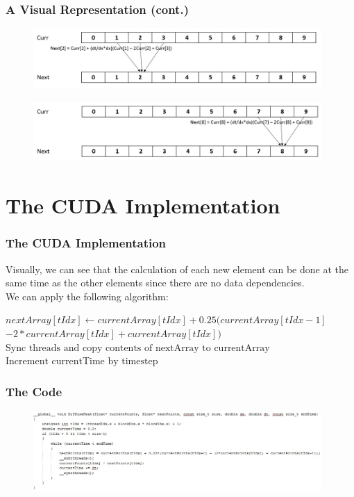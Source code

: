 \documentclass{beamer}
\begin{document}
\begin{frame}
	\frametitle{A Visual Representation (cont.)}
	\begin{figure}
		\includegraphics[width=11cm]{Visual2.jpg}
	\end{figure}
	\bigskip
	\begin{figure}
		\includegraphics[width=11cm]{Visual3.jpg}
	\end{figure}
\end{frame}

\section{The CUDA Implementation}
\begin{frame}
	\frametitle{The CUDA Implementation}
	Visually, we can see that the calculation of each new element can be done at the same time as the other elements since there are no data dependencies.\\
	We can apply the following algorithm:\\
	\begin{algorithmic}
		\State $nextArray[tIdx] \gets currentArray[tIdx] + 0.25(currentArray[tIdx-1]$\\$-2*currentArray[tIdx] + currentArray[tIdx])$
		\State $\text{Sync threads and copy contents of nextArray to currentArray}$
		\State $\text{Increment currentTime by timestep}$		
		\EndWhile
		\EndIf
	\end{algorithmic}
\end{frame}

\begin{frame}
	\frametitle{The Code}
	\begin{figure}
		\includegraphics[width=11cm]{cudacode.jpg}
	\end{figure}
\end{frame}
\end{document}
